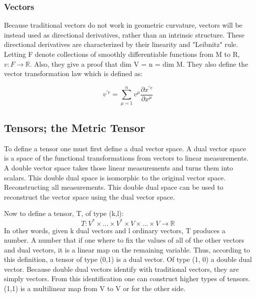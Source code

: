 \subsubsection{Vectors}

Because traditional vectors do not work in geometric curvature, vectors will be instead used as directional derivatives, rather than an intrinsic structure. These directional derivatives are characterized by their linearity and "Leibnitz" rule. Letting F denote collections of smoothly differentiable functions from M to R, $v: F \to \mathbb{R}$. Also, they give a proof that dim V = n = dim M. They also define the vector transformation law which is defined as:

$$v^{'v}=\sum_{\mu=1}^n v^\mu \frac{\partial x^{'v}}{\partial x^\mu}$$

\subsection{Tensors; the Metric Tensor}

To define a tensor one must first define a dual vector space. A dual vector space is a space of the functional transformations from vectors to linear measurements. A double vector space takes those linear measurements and turns them into scalars. This double dual space is isomorphic to the original vector space. Reconstructing all measurements. This double dual space can be used to reconstruct the vector space using the dual vector space.

Now to define a tensor, T, of type (k,l):
\[
T: V^* \times ... \times V^* \times V \times ... \times V \to \mathbb{R}
\]
In other words, given k dual vectors and l ordinary vectors, T produces a number. A number that if one where to fix the values of all of the other vectors and dual vectors, it is a linear map on the remaining variable. Thus, according to this definition, a tensor of type (0,1) is a dual vector. Of type (1, 0) a double dual vector. Because double dual vectors identify with traditional vectors, they are simply vectors. From this identification one can construct higher types of tensors. (1,1) is a multilinear map from V to V or for the other side.

